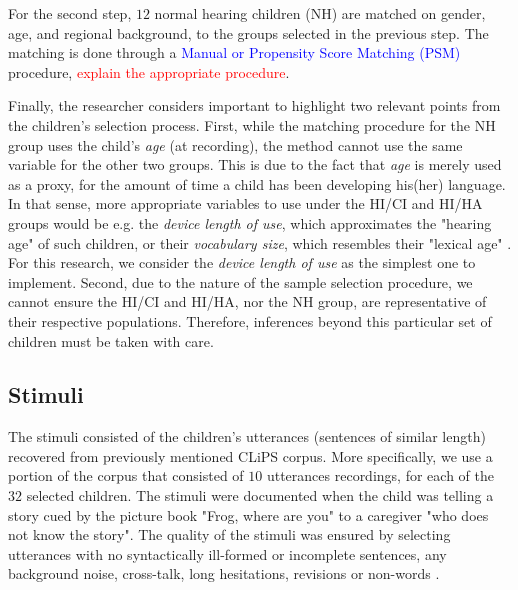 For the second step, $12$ normal hearing children (NH) are matched on gender, age, and regional background, to the groups selected in the previous step. The matching is done through a \textcolor{blue}{Manual or Propensity Score Matching (PSM)} procedure, \textcolor{red}{explain the appropriate procedure}.

Finally, the researcher considers important to highlight two relevant points from the children's selection process. First, while the matching procedure for the NH group uses the child's \textit{age} (at recording), the method cannot use the same variable for the other two groups. This is due to the fact that \textit{age} is merely used as a proxy, for the amount of time a child has been developing his(her) language. In that sense, more appropriate variables to use under the HI/CI and HI/HA groups would be e.g. the \textit{device length of use}, which approximates the "hearing age" of such children, or their \textit{vocabulary size}, which resembles their "lexical age" \citep{Faes_et_al_2021}. For this research, we consider the \textit{device length of use} as the simplest one to implement. Second, due to the nature of the sample selection procedure, we cannot ensure the HI/CI and HI/HA, nor the NH group, are representative of their respective populations. Therefore, inferences beyond this particular set of children must be taken with care.

\begin{comment}
\textbf{for the experimenter:} Based on \citet{Faes_et_al_2021} we depict the procedure for the experimenter:
%
\begin{enumerate}
	\item 1. matching procedure 
	\item selection of suitable stimuli
	\item determine the number of stimuli per judge 
	\item 
\end{enumerate}	
\end{comment}
%
%
\subsection{Stimuli} \label{s_sect:stimuli}
%
The stimuli consisted of the children's utterances (sentences of similar length) recovered from previously mentioned CLiPS corpus. More specifically, we use a portion of the corpus that consisted of $10$ utterances recordings, for each of the $32$ selected children. The stimuli were documented when the child was telling a story cued by the picture book "Frog, where are you" \citep{Mayer_1969} to a caregiver "who does not know the story". The quality of the stimuli was ensured by selecting utterances with no syntactically ill-formed or incomplete sentences, any background noise, cross-talk, long hesitations, revisions or non-words \citep{Boonen_et_al_2021}. 

